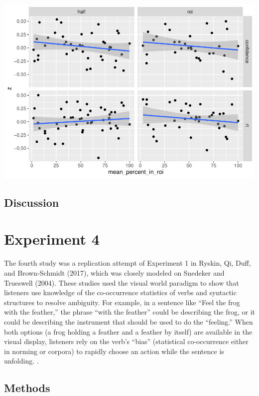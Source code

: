 \documentclass[
  man,floatsintext]{apa6}
\begin{document}
\includegraphics{manuscript_files/figure-latex/E3-cal Plot correlations with calibration.score-1.pdf}

\hypertarget{discussion-2}{%
\subsection{Discussion}\label{discussion-2}}

\hypertarget{experiment-4}{%
\section{Experiment 4}\label{experiment-4}}

The fourth study was a replication attempt of Experiment 1 in Ryskin, Qi, Duff, and Brown-Schmidt (2017), which was closely modeled on Snedeker and Trueswell (2004). These studies used the visual world paradigm to show that listeners use knowledge of the co-occurrence statistics of verbs and syntactic structures to resolve ambiguity. For example, in a sentence like ``Feel the frog with the feather,'' the phrase ``with the feather'' could be describing the frog, or it could be describing the instrument that should be used to do the ``feeling.'' When both options (a frog holding a feather and a feather by itself) are available in the visual display, listeners rely on the verb's ``bias'' (statistical co-occurrence either in norming or corpora) to rapidly choose an action while the sentence is unfolding.
.

\hypertarget{methods-3}{%
\subsection{Methods}\label{methods-3}}
\end{document}
